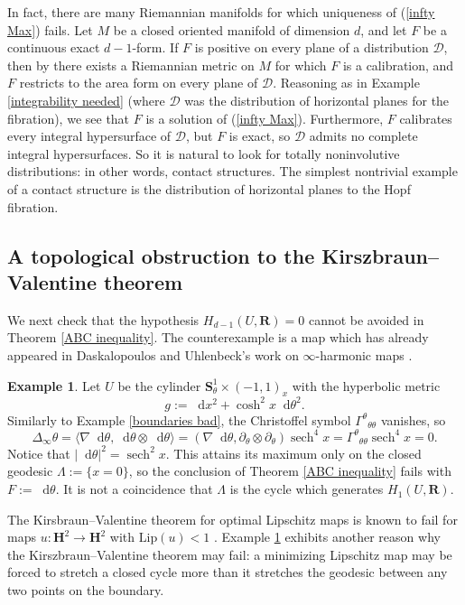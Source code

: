 \documentclass[reqno,11pt]{amsart}
\newcommand{\RR}{\mathbf{R}}
\newcommand{\Hyp}{\mathbf H}
\newcommand{\Sph}{\mathbf S}
\newcommand*\dif{\mathop{}\!\mathrm{d}}
\DeclareMathOperator{\sech}{sech}
\newcommand{\Lip}{\mathrm{Lip}}
\theoremstyle{definition}
\newtheorem{example}[theorem]{Example}
\numberwithin{equation}{section}
\begin{document}
In fact, there are many Riemannian manifolds for which uniqueness of (\ref{infty Max}) fails.
Let $M$ be a closed oriented manifold of dimension $d$, and let $F$ be a continuous exact $d - 1$-form. 
If $F$ is positive on every plane of a distribution $\mathscr D$, then by \cite[Proposition 4.1]{bangert_cui_2017} there exists a Riemannian metric on $M$ for which $F$ is a calibration, and $F$ restricts to the area form on every plane of $\mathscr D$.
Reasoning as in Example \ref{integrability needed} (where $\mathscr D$ was the distribution of horizontal planes for the fibration), we see that $F$ is a solution of (\ref{infty Max}).
Furthermore, $F$ calibrates every integral hypersurface of $\mathscr D$, but $F$ is exact, so $\mathscr D$ admits no complete integral hypersurfaces.
So it is natural to look for totally noninvolutive distributions: in other words, contact structures.
The simplest nontrivial example of a contact structure is the distribution of horizontal planes to the Hopf fibration.

\subsection{A topological obstruction to the Kirszbraun--Valentine theorem}
We next check that the hypothesis $H_{d - 1}(U, \RR) = 0$ cannot be avoided in Theorem \ref{ABC inequality}.
The counterexample is a map which has already appeared in Daskalopoulos and Uhlenbeck's work on $\infty$-harmonic maps \cite[\S8]{daskalopoulos2022}.

\begin{example}\label{exactness needed}
Let $U$ be the cylinder $\Sph^1_\theta \times (-1, 1)_x$ with the hyperbolic metric
$$g := \dif x^2 + \cosh^2 x \dif \theta^2.$$
Similarly to Example \ref{boundaries bad}, the Christoffel symbol ${\Gamma^\theta}_{\theta \theta}$ vanishes, so
$$\Delta_\infty \theta = \langle \nabla \dif \theta, \dif \theta \otimes \dif \theta\rangle = (\nabla \dif \theta, \partial_\theta \otimes \partial_\theta) \sech^4 x =  {\Gamma^\theta}_{\theta \theta} \sech^4 x = 0.$$
Notice that $|\dif \theta|^2 = \sech^2 x$.
This attains its maximum only on the closed geodesic $\Lambda := \{x = 0\}$, so the conclusion of Theorem \ref{ABC inequality} fails with $F := \dif \theta$.
It is not a coincidence that $\Lambda$ is the cycle which generates $H_1(U, \RR)$.
\end{example}

The Kirsbraun--Valentine theorem for optimal Lipschitz maps is known to fail for maps $u: \Hyp^2 \to \Hyp^2$ with $\Lip(u) < 1$ \cite[Example 9.6]{Gu_ritaud_2017}.
Example \ref{exactness needed} exhibits another reason why the Kirszbraun--Valentine theorem may fail: a minimizing Lipschitz map may be forced to stretch a closed cycle more than it stretches the geodesic between any two points on the boundary.
\end{document}
